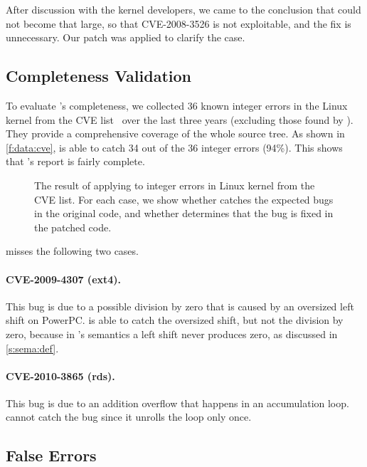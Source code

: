 After discussion with the kernel developers, we came to the conclusion
that  could not become that large, so that CVE-2008-3526 is
not exploitable, and the fix is unnecessary. Our patch was applied to 
clarify the case.


\subsection{Completeness Validation}
\label{s:eval:complete}

To evaluate \sys's completeness, we collected 36 known integer errors in the
Linux kernel from the CVE list~\cite{cve} over the last three years (excluding
those found by \sys).  They provide a comprehensive coverage of the whole source
tree. 
%
As shown in \autoref{f:data:cve}, 
\sys is able to catch 34 out of the 36 integer errors (94\%).
This shows that \sys's report is fairly complete.

\begin{figure}
\centering
\footnotesize

\caption{The result of applying \sys to integer errors in Linux
kernel from the CVE list.  For each case, we show whether \sys
catches the expected bugs in the original code, and whether \sys
determines that the bug is fixed in the patched code.}
\label{f:data:cve}
\end{figure}

\sys misses the following two cases.

\paragraph{CVE-2009-4307 (ext4).}
This bug is due to a possible division by zero that is caused by
an oversized left shift on PowerPC\@.  \sys is able to catch the
oversized shift, but not the division by zero, because in \sys's
semantics a left shift never produces zero, as discussed in
\autoref{s:sema:def}.

\paragraph{CVE-2010-3865 (rds).}
This bug is due to an addition overflow that happens in an accumulation
loop.  \sys cannot catch the bug since it unrolls the loop only
once.

\subsection{False Errors}

